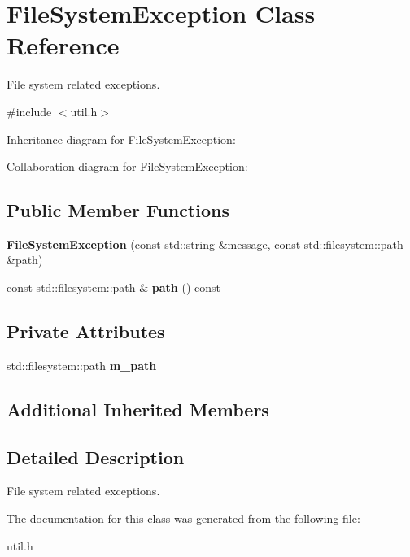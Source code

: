 \hypertarget{classFileSystemException}{}\section{File\+System\+Exception Class Reference}
\label{classFileSystemException}


File system related exceptions.  




{\ttfamily \#include $<$util.\+h$>$}



Inheritance diagram for File\+System\+Exception\+:


Collaboration diagram for File\+System\+Exception\+:
\subsection*{Public Member Functions}
\begin{DoxyCompactItemize}
\item 
\mbox{\label{classFileSystemException_aa4892d06541a6101723e65630bf4d069}} 
{\bfseries File\+System\+Exception} (const std\+::string \&message, const std\+::filesystem\+::path \&path)
\item 
\mbox{\label{classFileSystemException_a50879844b41a84f9ba2c1f64c4e2b999}} 
const std\+::filesystem\+::path \& {\bfseries path} () const
\end{DoxyCompactItemize}
\subsection*{Private Attributes}
\begin{DoxyCompactItemize}
\item 
\mbox{\label{classFileSystemException_a57fa88ba295bcf2a759d5d505746da26}} 
std\+::filesystem\+::path {\bfseries m\+\_\+path}
\end{DoxyCompactItemize}
\subsection*{Additional Inherited Members}


\subsection{Detailed Description}
File system related exceptions. 

The documentation for this class was generated from the following file\+:\begin{DoxyCompactItemize}
\item 
util.\+h\end{DoxyCompactItemize}
